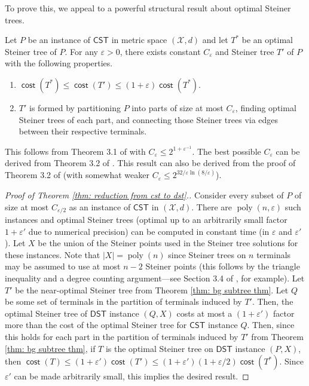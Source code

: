 \documentclass{theoretics}
\DeclareMathOperator{\cost}{\mathsf{cost}}
\DeclareMathOperator{\poly}{poly}
\newcommand{\1}{\textbf{1}}
\newcommand{\cst}{$\mathsf{CST}$\xspace}
\newcommand{\dst}{$\mathsf{DST}$\xspace}
\begin{document}
To prove this, we appeal to a powerful structural result about optimal Steiner trees.
\begin{theorem} \label{thm: bg subtree thm}
Let $P$ be an instance of \cst in metric space $(\mathcal{X}, d)$ and let $T^*$ be an optimal Steiner tree of $P$. For any $\varepsilon > 0$, there exists constant $C_{\varepsilon}$ and Steiner tree $T'$ of $P$ with the following properties.
\begin{enumerate}
    \item $\cost(T^*) \leq \cost(T') \leq (1 + \varepsilon)\cost(T^*)$.
    \item $T'$ is formed by  partitioning $P$ into parts of size at most $C_{\varepsilon}$, finding optimal Steiner trees of each part, and connecting those Steiner trees via edges between their respective terminals.
\end{enumerate}
\end{theorem}
This follows from Theorem 3.1 of \cite{DuZhangFeng91} with $C_{\varepsilon} \leq 2^{1 + \varepsilon^{-1}}$. The best possible $C_\varepsilon$ can be derived from Theorem 3.2 of \cite{Borchers97}. This result can also be derived from the proof of Theorem 3.2 of \cite{Bartal_Gottlieb_2021} (with somewhat weaker $C_{\varepsilon} \leq 2^{32/\varepsilon \ln (8/\varepsilon)}$).

\begin{proof}[Proof of Theorem \ref{thm: reduction from cst to dst}.]
Consider every subset of $P$ of size at most $C_{\varepsilon/2}$ as an instance of \cst in $(\mathcal{X}, d)$. There are $\poly(n, \varepsilon)$ such instances and optimal Steiner trees (optimal up to an arbitrarily small factor $1 + \varepsilon'$ due to numerical precision) can be computed in constant time (in $\varepsilon$ and $\varepsilon'$). Let $X$ be the union of the Steiner points used in the Steiner tree solutions for these instances. Note that $|X| = \poly(n)$ since Steiner trees on $n$ terminals may be assumed to use at most $n-2$ Steiner points (this follows by the triangle inequality and a degree counting argument—see Section 3.4 of \cite{Gilbert_Pollak_1968}, for example). Let $T'$ be the near-optimal Steiner tree from  Theorem \ref{thm: bg subtree thm}. Let $Q$ be some set of terminals in the partition of terminals induced by $T'$. Then, the optimal Steiner tree of \dst instance $(Q, X)$ costs at most a $(1 + \varepsilon')$ factor more than the cost of the optimal Steiner tree for \cst instance $Q$. Then, since this holds for each part in the partition of terminals induced by $T'$ from Theorem \ref{thm: bg subtree thm}, if $T$ is the optimal Steiner tree on \dst instance $(P, X)$, then $\cost(T) \leq (1 + \varepsilon') \cost(T') \leq (1 + \varepsilon') (1 + \varepsilon/2)  \cost(T^*)$. Since $\varepsilon'$ can be made arbitrarily small, this implies the desired result.
\end{proof}
\end{document}
